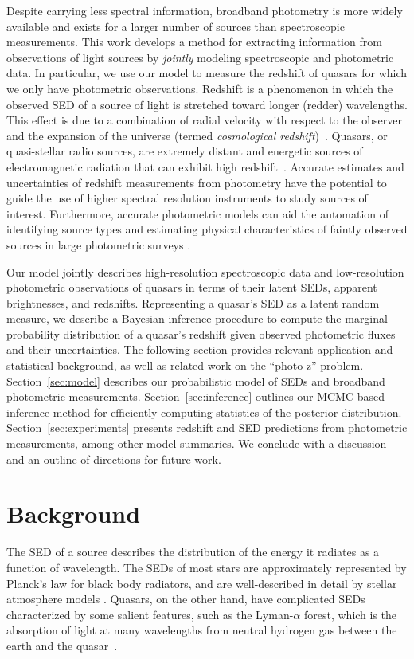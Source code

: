 \documentclass{article} %
\begin{document}
Despite carrying less spectral information, broadband photometry is more widely available and exists for a larger number of sources than spectroscopic measurements. 
This work develops a method for extracting information from observations of light sources by \emph{jointly} modeling spectroscopic and photometric data.  
In particular, we use our model to measure the redshift of quasars for which we only have photometric observations.  
Redshift is a phenomenon in which the observed SED of a source of light is stretched toward longer (redder) wavelengths.
This effect is due to a combination of radial velocity with respect to the observer and the expansion of the universe (termed \emph{cosmological redshift})~\cite{hogg1999distance, harrison1993redshift}.  
Quasars, or quasi-stellar radio sources, are extremely distant and energetic sources of electromagnetic radiation that can exhibit high redshift~\cite{silk1997quasars}.  
Accurate estimates and uncertainties of redshift measurements from photometry have the potential to guide the use of higher spectral resolution instruments to study sources of interest.  
Furthermore, accurate photometric models can aid the automation of identifying source types and estimating physical characteristics of faintly observed sources in large photometric surveys \cite{regier2015}.  

Our model jointly describes high-resolution spectroscopic data and low-resolution photometric observations of quasars in terms of their latent SEDs, apparent brightnesses, and redshifts. 
Representing a quasar's SED as a latent random measure, we describe a Bayesian inference procedure to compute the marginal probability distribution of a quasar's redshift given observed photometric fluxes and their uncertainties.  
The following section provides relevant application and statistical background, as well as related work on the ``photo-z'' problem.
Section~\ref{sec:model} describes our probabilistic model of SEDs and broadband photometric measurements.
Section~\ref{sec:inference} outlines our MCMC-based inference method for efficiently computing statistics of the posterior distribution.
Section~\ref{sec:experiments} presents redshift and SED predictions from photometric measurements, among other model summaries.
We conclude with a discussion and an outline of directions for future work.  

\section{Background}
\label{sec:background}
The SED of a source describes the distribution of the energy it radiates as a function of wavelength.  
The SEDs of most stars are approximately represented by Planck’s law for black body radiators, and are well-described in detail by stellar atmosphere models \cite{gray2001physical}.  
Quasars, on the other hand, have complicated SEDs characterized by some salient features, such as the Lyman-$\alpha$ forest, which is the absorption of light at many wavelengths from neutral hydrogen gas between the earth and the quasar~\cite{weinberg2003lymanalpha}.
\end{document}
